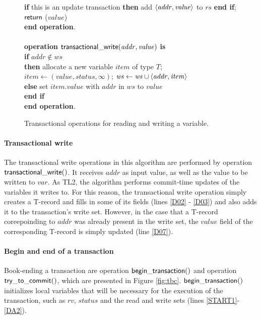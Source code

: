 \documentclass[11pt,letterpaper]{article}
\begin{document}
\begin{figure}
{{\begin{minipage}[t]{150mm}
\begin{tabbing}
 \> {\bf if} this is an update transaction 
                        {\bf then} add $\left \langle \mathit{addr,value} \right \rangle $ to $\mathit{rs}$ {\bf end if}; \\
 \> ${\sf return}$ ($\mathit{value}$) \\
{\bf end operation}. \\
\\
{\bf operation}  ${\sf transactional\_write}(\mathit{addr, value})$ {\bf is}\\
 \> {\bf if} $\mathit{addr} \not\in \mathit{ws}$  \\
 \>\> {\bf then} \> allocate a new variable $item$ of type $T$; \\
 \>\>\> $\mathit{item}  \gets (\mathit{value, status, \infty})$; 
                   $\mathit{ws} \gets \mathit{ws} \cup \left \langle \mathit{addr, item} \right \rangle $ \\
 \>\> {\bf else} \> set $\mathit{item.value}$ with $\mathit{addr}$ in $\mathit{ws}$ to $\mathit{value}$ \\
 \> {\bf end if} \\
{\bf end operation}.
\end{tabbing}
\normalsize
\end{minipage}
}
\caption{Transactional operations for reading and writing a variable.}
\label{fig:tops}
}
\end{figure}

\paragraph{Transactional write}
The transactional write operations in this algorithm are performed by 
operation ${\sf transactional\_write()}$. 
It receives $\mathit{addr}$ as input value, as well as the value 
to be written to $\mathit{var}$. As  TL2, the algorithm 
performs commit-time updates of the variables it writes to. 
For this reason, the transactional write  
operation simply creates a T-record and fills in some of its 
fields (lines \ref{D02} - \ref{D03}) and also 
adds it to the transaction{}'s write set.
However, in the case that a T-record coreepoinding to $\mathit{addr}$  was
already present in  the write set, the
$\mathit{value}$ field of the corresponding  
T-record is simply updated (line \ref{D07}).


\paragraph{Begin and end of a transaction} 
Book-ending a transaction are operation ${\sf begin\_transaction()}$ 
and operation ${\sf try\_to\_commit()}$, which are 
presented in Figure \ref{fig:tbc}. ${\sf begin\_transaction()}$ 
initializes local variables that will be necessary 
for the execution of the transaction, such as $\mathit{rv}$, 
$\mathit{status}$ and the read and write sets 
(lines \ref{START1}-\ref{DA2}). 
\end{document}
